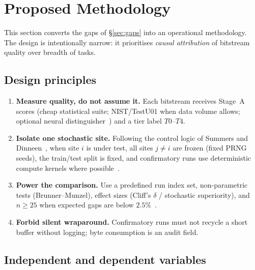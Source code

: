 \section{Proposed Methodology}
\label{sec:methodology}

This section converts the gaps of \S\ref{sec:gaps} into an operational methodology.
The design is intentionally narrow: it prioritises \emph{causal attribution} of bitstream quality over breadth of tasks.

\subsection{Design principles}

\begin{enumerate}[leftmargin=*]
  \item \textbf{Measure quality, do not assume it.}
  Each bitstream receives Stage~A scores (cheap statistical suite; NIST/TestU01 when data volume allows; optional neural distinguisher~\cite{valle2024assessing}) and a tier label $T0$--$T4$.

  \item \textbf{Isolate one stochastic site.}
  Following the control logic of Summers and Dinneen~\cite{summers2021nondeterminism}, when site $i$ is under test, all sites $j\neq i$ are frozen (fixed PRNG seeds), the train/test split is fixed, and confirmatory runs use deterministic compute kernels where possible~\cite{zhuang2022randomness}.

  \item \textbf{Power the comparison.}
  Use a predefined run index set, non-parametric tests (Brunner--Munzel), effect sizes (Cliff's $\delta$ / stochastic superiority), and $n\geq 25$ when expected gaps are below $2.5\%$~\cite{akesson2024reporting}.

  \item \textbf{Forbid silent wraparound.}
  Confirmatory runs must not recycle a short buffer without logging; byte consumption is an audit field.
\end{enumerate}

\subsection{Independent and dependent variables}

